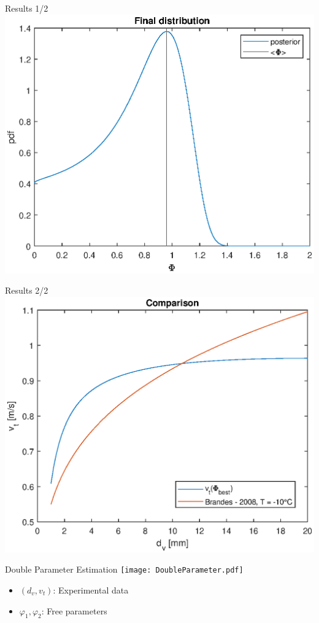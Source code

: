 \documentclass[11pt]{beamer}
\begin{document}
	\begin{frame}{Results 1/2}
		\centering
		\includegraphics[width=\linewidth]{ChienPost.eps}
	\end{frame}

	\begin{frame}{Results 2/2}
		\centering
		\includegraphics[width=\linewidth]{ChienComparison.eps}
	\end{frame}

	\begin{frame}{Double Parameter Estimation}
		\centering
		\texttt{[image: DoubleParameter.pdf]}
		\begin{itemize}
			\item $ (d_v, v_t) $: Experimental data
			\item $ \varphi_1, \varphi_2 $: Free parameters
		\end{itemize}
	\end{frame}
	
\end{document}
